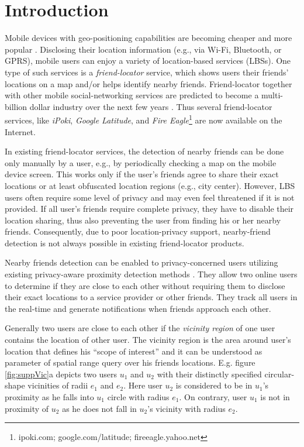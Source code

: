 \section{Introduction} \label{sec:intro}
%
Mobile devices with geo-positioning capabilities are
becoming cheaper and more popular \cite{gps1}. Disclosing their
location information (e.g., via Wi-Fi, Bluetooth, or GPRS), mobile
users can enjoy a variety of location-based services (LBSs). 
One type of such services is a {\em friend-locator} service, which
shows users their friends' locations on a map and/or helps identify
nearby friends. Friend-locator together with other mobile social-networking
services are predicted to become a multi-billion dollar industry over the next
few years \cite{mobsn}. Thus several friend-locator services, like
\textit{iPoki}, \textit{Google Latitude}, and \textit{Fire Eagle}\footnote{
ipoki.com; \; google.com/latitude; \; fireeagle.yahoo.net} 
are now available on the Internet.

In existing friend-locator services, the detection of nearby friends can be done
only manually by a user, e.g., by periodically checking a map on the
mobile device screen. This works only if the user's friends agree to share their
exact locations or at least obfuscated location regions (e.g., city center).
However, LBS users often require some level of privacy and may even feel
threatened \cite{stalk3} if it is not provided. If all user's friends require
complete privacy, they have to disable their location sharing, thus also
preventing the user from finding his or her nearby friends. Consequently, due to
poor location-privacy support, nearby-friend detection is not always
possible in existing friend-locator products.


Nearby friends detection can be enabled to privacy-concerned users utilizing
existing privacy-aware proximity detection methods 
\cite{proxDetTrans,pbsPaper,ffinder,longitudePaper}.
They allow two online users to determine if they are close to each other without
requiring them to disclose their exact locations to a service provider or other
friends. They track all users in the real-time and generate notifications when
friends approach each other.


% 

Generally two users are close to each other if the
\textit{vicinity region} of one user contains the location of other user. The
vicinity region is the area around user's location that defines his ``scope of
interest'' and it can be understood as parameter of spatial range query over his
friends locations. E.g. figure \ref{fig:suppVic}a depicts two users $u_1$ and $u_2$
with their distinctly specified circular-shape vicinities of radii $e_1$ and
$e_2$. Here user $u_2$ is considered to be in $u_1$'s proximity as he falls into
$u_1$ circle with radius $e_1$. On contrary, user $u_1$ is not in proximity of
$u_2$ as he does not fall in $u_2$'s vicinity with radius $e_2$.


